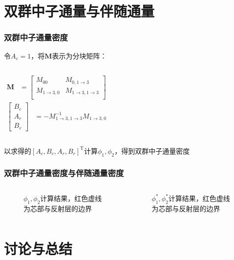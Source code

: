 \documentclass[handout,10pt]{beamer}
\begin{document}
\section{双群中子通量与伴随通量}

\begin{frame}
\frametitle{双群中子通量密度}
令$A_c=1$，将$\pmb{M}$表示为分块矩阵：

\begin{columns}
\begin{align*}
    \pmb{M} &= \begin{bmatrix}
        M_{00} & M_{0,1\rightarrow 3} \\
        M_{1\rightarrow 3,0} & M_{1\rightarrow 3,1\rightarrow 3} \\
    \end{bmatrix}
\end{align*}
\begin{align*}
    \begin{bmatrix}
        B_c \\
        A_r \\
        B_r
    \end{bmatrix} &= 
    -M_{1\rightarrow 3,1\rightarrow 3}^{-1}M_{1\rightarrow 3,0}
\end{align*}
\end{columns}
以求得的$\left[A_c,B_c,A_r,B_r\right]^{\mathrm{T}}$计算$\phi_1,\phi_2$，得到双群中子通量密度
\end{frame}

\begin{frame}
\frametitle{双群中子通量密度与伴随通量密度}
\begin{columns}
\begin{figure}[H]
    \centering
    
    \caption{$\phi_1,\phi_2$计算结果，红色虚线为芯部与反射层的边界}
    \label{fig:flux_r}
\end{figure}
\begin{figure}[H]
    \centering
    
    \caption{$\phi_1^*,\phi_2^*$计算结果，红色虚线为芯部与反射层的边界}
    \label{fig:flux_r_adjoint}
\end{figure}
\end{columns}
\end{frame}

\section{讨论与总结}
\end{document}
